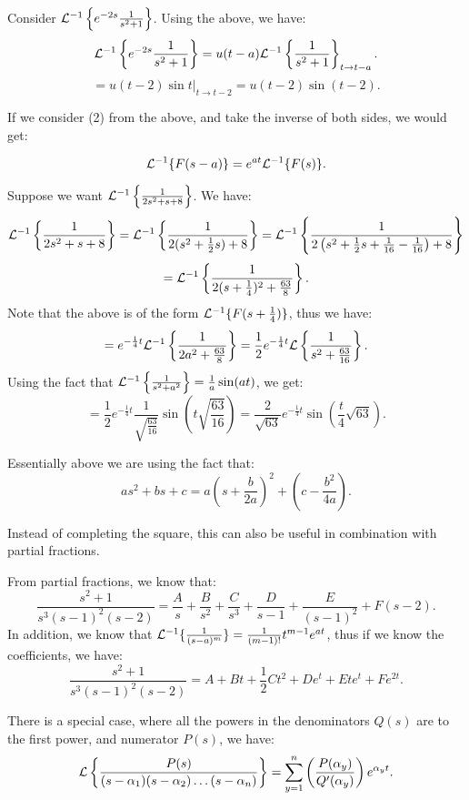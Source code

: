 \documentclass[../main/main.tex]{subfiles}
\begin{document}
\begin{example}
	Consider $\mathcal{L} ^{-1} \left\{e^{-2s}\frac{1}{s^2+1}\right\} $. Using the above, we have: \[
		\mathcal{L} ^{-1}\left\{e^{-2s}\frac{1}{s^2+1}\right\} = u(t-a) \mathcal{L}^{-1} \left\{\frac{1}{s^2+1}\right\}_{t\to t-a} 
	.\] \[
= u(t-2) \sin t \big\rvert_{t\to t-2} = u(t-2)\sin(t-2)
	.\] 
\end{example}
If we consider (2) from the above, and take the inverse of both sides, we would get:
\begin{theorem}
	\[
		\mathcal{L} ^{-1} \{F(s-a)\} = e^{at}\mathcal{L} ^{-1} \{F(s)\} 
	.\] 	
\end{theorem}
\begin{example}
	Suppose we want $\mathcal{L} ^{-1} \left\{ \frac{1}{2s^2+s+8}\right\}$. We have: \[
		\mathcal{L} ^{-1} \left\{ \frac{1}{2s^2+s+8}\right\} = \mathcal{L} ^{-1} \left\{ \frac{1}{2(s^2+\frac{1}{2}s)+8}\right\} = \mathcal{L}^{-1}\left\{ \frac{1}{2\left( s^2+\frac{1}{2}s+\frac{1}{16}-\frac{1}{16} \right) +8}\right\}
	\] \[
	= \mathcal{L}^{-1} \left\{ \frac{1}{2(s+\frac{1}{4})^2+\frac{63}{8}}  \right\} 
.\] Note that the above is of the form $\mathcal{L}^{-1}\{F(s+\frac{1}{4})\} $, thus we have: \[
= e^{-\frac{1}{4}t}\mathcal{L}^{-1} \left\{\frac{1}{2a^2+\frac{63}{8}}\right\} = \frac{1}{2}e^{-\frac{1}{4}t}\mathcal{L} \left\{ \frac{1}{s^2+\frac{63}{16}}\right\}
.\] Using the fact that $\mathcal{L}^{-1}\left\{ \frac{1}{s^2+a^2}\right\} = \frac{1}{a}\sin(at)$, we get: \[
= \frac{1}{2}e^{-\frac{1}{4}t} \frac{1}{\sqrt{\frac{63}{16}} }\sin\left( t \sqrt{\frac{63}{16}}  \right) = \frac{2}{\sqrt{63} }e^{-\frac{1}{4}t}\sin\left( \frac{t}{4}\sqrt{63}  \right) 
.\] 
\end{example}
\begin{remark}
	Essentially above we are using the fact that: \[
		as^2+bs+c = a\left( s+\frac{b}{2a} \right) ^2 + \left( c-\frac{b^2}{4a} \right) 
	.\] 
\end{remark}
Instead of completing the square, this can also be useful in combination with partial fractions. 
\begin{example}
	From partial fractions, we know that: \[
		\frac{s^2+1}{s^{3}(s-1)^2(s-2)}= \frac{A}{s}+ \frac{B}{s^2}+\frac{C}{s^{3}}+ \frac{D}{s-1}+\frac{E}{(s-1)^2}+F(s-2)
	.\] 
	In addition, we know that $\mathcal{L} ^{-1} \{\frac{1}{(s-a)^m}\} = \frac{1}{(m-1)!}t ^{m-1}e^{at}$, thus if we know the coefficients, we have:  \[
		\frac{s^2+1}{s^{3}(s-1)^2(s-2)}= A+Bt+\frac{1}{2}Ct^2+De^{t}+Ete^{t}+Fe^{2t} 
	.\] 
\end{example}
\begin{theorem}
	There is a special case, where all the powers in the denominators $Q(s)$ are to the first power, and numerator $P(s)$, we have:
	\[
		\mathcal{L} \left\{ \frac{P(s)}{(s-\alpha_1)(s-\alpha_2)\ldots(s-\alpha_n)} \right\} = \sum_{y=1}^{n} \left( \frac{P(\alpha_y)}{Q'(\alpha_y)} \right) e^{\alpha_y t}
	.\] 
\end{theorem}
\end{document}
